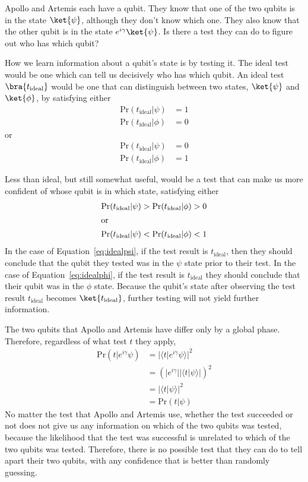 \documentclass{article}
\theoremstyle{definition}
\newcommand{\abs}[1]{{\big\vert} #1 {\big\vert}}
\begin{document}
\begin{example}
	Apollo and Artemis each have a qubit.  They know that one of the two qubits is in the state $\ket{\psi}$, although they don't know which one.  They also know that the other qubit is in the state $e^{i \gamma} \ket{\psi}$.  Is there a test they can do to figure out who has which qubit?

	\textnormal{How we learn information about a qubit's state is by testing it.  The ideal test would be one which can tell us decisively who has which qubit.  An ideal test $\bra{t_\text{ideal}}$ would be one that can distinguish between two states, $\ket{\psi}$ and $\ket{\phi}$, by satisfying either}
	\begin{align}
		\text{Pr}(t_\text{ideal} | \psi) &= 1\\
		\text{Pr}(t_\text{ideal} | \phi) &= 0
	\end{align}
	\textnormal{or}
	\begin{align}
		\text{Pr}(t_\text{ideal} | \psi) &= 0\\
		\text{Pr}(t_\text{ideal} | \phi) &= 1
	\end{align}

	\textnormal{Less than ideal, but still somewhat useful, would be a test that can make us more confident of whose qubit is in which state, satisfying either}
	\begin{align}
		\text{Pr}(t_\text{ideal} | \psi) &> \text{Pr}(t_\text{ideal} | \phi)\label{eq:idealpsi} > 0\\
		\intertext{\textnormal{or}}
		\text{Pr}(t_\text{ideal} | \psi) &< \text{Pr}(t_\text{ideal} | \phi)\label{eq:idealphi} < 1
	\end{align}
	\textnormal{In the case of Equation~\ref{eq:idealpsi}, if the test result is $t_\text{ideal}$, then they should conclude that the qubit they tested was in the $\psi$ state prior to their test.  In the case of Equation~\ref{eq:idealphi}, if the test result is $t_\text{ideal}$ they should conclude that their qubit was in the $\phi$ state.  Because the qubit's state after observing the test result $t_\text{ideal}$ becomes $\ket{t_\text{ideal}}$, further testing will not yield further information.}

	\textnormal{The two qubits that Apollo and Artemis have differ only by a global phase.  Therefore, regardless of what test $t$ they apply,}
	\begin{align}
		\text{Pr}(t | e^{i \gamma} \psi) &= \abs{\langle t | e^{i \gamma} \psi \rangle}^2\\
		&= \left(\abs{e^{i \gamma}}\abs{\langle t | \psi \rangle}\right)^2\\
		&= \abs{\langle t | \psi \rangle}^2\\
		&= \text{Pr}( t | \psi)
	\end{align}
	\textnormal{No matter the test that Apollo and Artemis use, whether the test succeeded or not does not give us any information on which of the two qubits was tested, because the likelihood that the test was successful is unrelated to which of the two qubits was tested.  Therefore, there is no possible test that they can do to tell apart their two qubits, with any confidence that is better than randomly guessing.}
\end{example}
\end{document}

